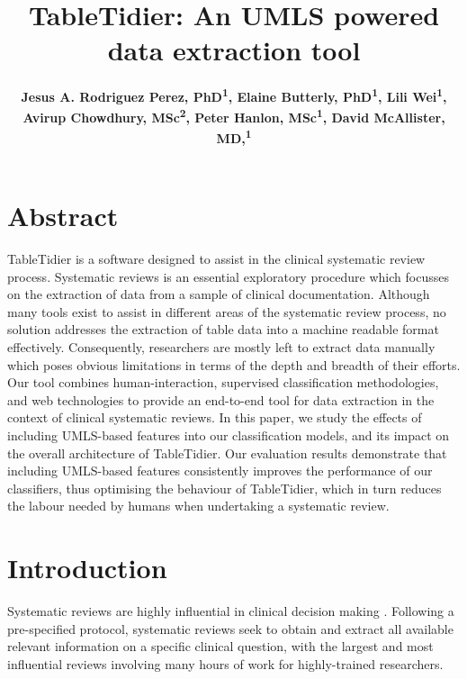 \documentclass[10.7pt,]{article}
\title{\vspace{-2em} TableTidier: An UMLS powered data extraction tool}
\author[ ]{\bf\fontsize{13}{14}\selectfont 
	Jesus A. Rodriguez Perez, PhD\textsuperscript{1}, 
	Elaine Butterly, PhD\textsuperscript{1}, 
	Lili Wei\textsuperscript{1}, 
	Avirup Chowdhury, MSc\textsuperscript{2}, 
	Peter Hanlon, MSc\textsuperscript{1},
	David McAllister, MD,\textsuperscript{1}
	\vspace{-.7em}
}
\affil[1]{\bf\fontsize{13}{14}\selectfont The University of Glasgow, UK}
\affil[2]{\bf\fontsize{13}{14}\selectfont Public Health Suffolk, Suffolk County Council, UK}
\date{} %
\begin{document}
\maketitle
\vspace{-4em} %

\section{Abstract}\label{abstract}
TableTidier is a software designed to assist in the clinical systematic review process. Systematic reviews is an essential exploratory procedure which focusses on the extraction of data from a sample of clinical documentation. Although many tools exist to assist in different areas of the systematic review process, no solution addresses the extraction of table data into a machine readable format effectively. Consequently, researchers are mostly left to extract data manually which poses obvious limitations in terms of the depth and breadth of their efforts. Our tool combines human-interaction, supervised classification methodologies, and web technologies to provide an end-to-end tool for data extraction in the context of clinical systematic reviews. In this paper, we study the effects of including UMLS-based features into our classification models, and its impact on the overall architecture of TableTidier. Our evaluation results demonstrate that including UMLS-based features consistently improves the performance of our classifiers, thus optimising the behaviour of TableTidier, which in turn reduces the labour needed by humans when undertaking a systematic review.

\section{Introduction}\label{introduction}



Systematic reviews are highly influential in clinical decision making \cite{Murad125}. Following a pre-specified protocol, systematic reviews seek to obtain and extract all available relevant information on a  specific clinical question, with the largest and most influential reviews involving many hours of work for highly-trained researchers\cite{higgins2011cochrane}.
\end{document}
